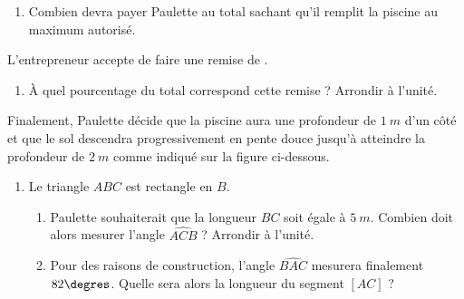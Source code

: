 \documentclass[12pt,french]{article}
\begin{document}
    \begin{enumerate}[resume]
        \item Combien devra payer Paulette au total sachant qu'il remplit la piscine au maximum autorisé.
    \end{enumerate}

    L'entrepreneur accepte de faire une remise de .

    \begin{enumerate}[resume]
        \item À quel pourcentage du total correspond cette remise ? Arrondir à l'unité.
    \end{enumerate}

    Finalement, Paulette décide que la piscine aura une profondeur de $1~m$ d'un côté et que le sol descendra progressivement en pente douce jusqu'à atteindre la profondeur de $2~m$ comme indiqué sur la figure ci-dessous.\medskip

    \begin{center}
    \end{center}

    \begin{enumerate}[resume]
        \item Le triangle $ABC$ est rectangle en $B$.
                \begin{enumerate}
                    \item Paulette souhaiterait que la longueur $BC$ soit égale à $5~m$. Combien doit alors mesurer l'angle $\widehat{ACB}$ ? Arrondir à l'unité.
                    \item Pour des raisons de construction, l'angle $\widehat{BAC}$ mesurera finalement $82\degres$. Quelle sera alors la longueur du segment $[AC]$ ?
                \end{enumerate}
    \end{enumerate}
\end{document}
